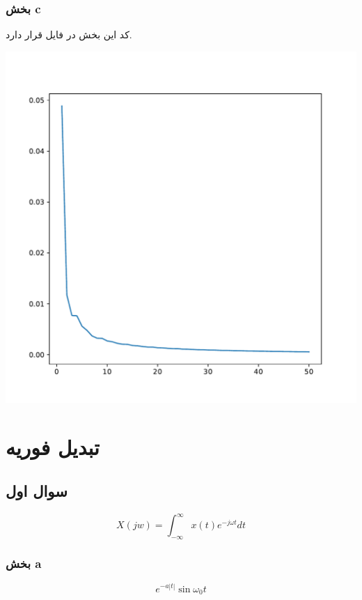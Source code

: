 \documentclass[12pt]{article}
\begin{document}
\subsubsection{بخش c}

کد این بخش در فایل
قرار دارد.



\begin{center}
	\includegraphics[width = 1.0 \textwidth]{images/6-3.pdf}
\end{center}

\newpage
\section{تبدیل فوریه}

\subsection{سوال اول}

$$X(jw) = \int_{-\infty}^{\infty} x(t) e^{-j \omega t} dt$$

\subsubsection{بخش a}

$$e^{- a |t|} \sin \omega_0 t$$
\end{document}
